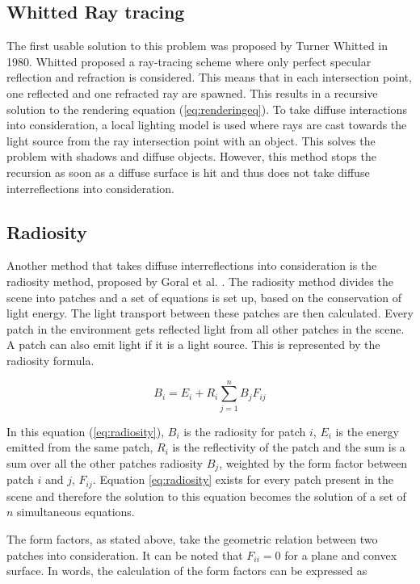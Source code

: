 \documentclass[a4paper]{report}
\begin{document}
\subsection{Whitted Ray tracing}

The first usable solution to this problem was proposed by Turner
Whitted \cite{whitted} in 1980. Whitted proposed a ray-tracing scheme
where only perfect specular reflection and refraction is
considered. This means that in each intersection point, one reflected
and one refracted ray are spawned. This results in a recursive
solution to the rendering equation (\ref{eq:renderingeq}). To take
diffuse interactions into consideration, a local
lighting model is used where rays are cast towards the light source
from the ray intersection point with an object. This solves the
problem with shadows and diffuse objects. However, this method stops
the recursion as soon as a diffuse surface is hit and thus does not
take diffuse interreflections into consideration.

\subsection{Radiosity}

Another method that takes diffuse interreflections into consideration
is the radiosity method, proposed by Goral et al. \cite{goral}. The
radiosity method divides the scene into patches and a set of equations
is set up, based on the conservation of light energy. The light transport
between these patches are then calculated. Every patch in the
environment gets reflected light from all other patches in the
scene. A patch can also emit light if it is a light source. This is
represented by the radiosity formula.

\begin{equation}
  B_i = E_i + R_i\sum^n_{j=1}B_jF_{ij}
  \label{eq:radiosity}
\end{equation}

In this equation (\ref{eq:radiosity}), \(B_i\) is the radiosity for
patch \(i\), \(E_i\) is the energy emitted from the same patch,
\(R_i\) is the reflectivity of the patch and the sum is a sum over all
the other patches radiosity \(B_j\), weighted by the form factor
between patch \(i\) and \(j\), \(F_{ij}\). Equation \ref{eq:radiosity}
exists for every patch present in the scene and therefore the solution
to this equation becomes the solution of a set of \(n\) simultaneous equations.

The form factors, as stated above, take the geometric relation between
two patches into consideration. It can be noted that \(F_{ii} = 0 \)
for a plane and convex surface. In words, the calculation of the form
factors can be expressed as
\end{document}
